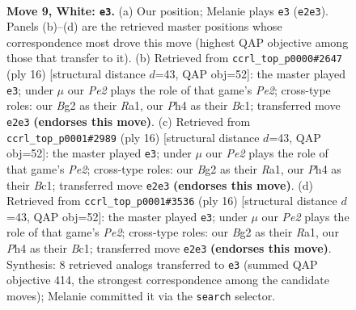 \documentclass[11pt]{article}
\begin{document}
\clearpage

\begin{figure}[p]\centering
\begin{subfigure}{0.46\textwidth}\centering
\resizebox{\linewidth}{!}{%
\newchessgame
\chessboard[
  setfen={1rbq1rk1/pp1pppbp/2n3p1/2p4n/2P4P/5NP1/PP1PPPB1/RNBQ1RK1 w - - 3 9},
  showmover=false,
  pgfstyle=straightmove, color=movearrow, markmove={e2-e3}
]}
\caption{}
\end{subfigure}\hfill
\begin{subfigure}{0.46\textwidth}\centering
\resizebox{\linewidth}{!}{%
\newchessgame
\chessboard[
  setfen={r1bq1rk1/ppp1ppbp/1nn3p1/8/3P4/2N2NP1/PP2PPBP/R1BQ1RK1 w - - 6 9},
  showmover=false,
  pgfstyle=straightmove, color=movearrow, markmove={e2-e3}
]}
\caption{}
\end{subfigure}
\\[4pt]
\begin{subfigure}{0.46\textwidth}\centering
\resizebox{\linewidth}{!}{%
\newchessgame
\chessboard[
  setfen={r1bq1rk1/ppp1ppbp/1nn3p1/8/3P4/2N2NP1/PP2PPBP/R1BQ1RK1 w - - 6 9},
  showmover=false,
  pgfstyle=straightmove, color=movearrow, markmove={e2-e3}
]}
\caption{}
\end{subfigure}\hfill
\begin{subfigure}{0.46\textwidth}\centering
\resizebox{\linewidth}{!}{%
\newchessgame
\chessboard[
  setfen={r1bq1rk1/ppp1ppbp/1nn3p1/8/3P4/2N2NP1/PP2PPBP/R1BQ1RK1 w - - 1 9},
  showmover=false,
  pgfstyle=straightmove, color=movearrow, markmove={e2-e3}
]}
\caption{}
\end{subfigure}
\caption{\textbf{Move 9, White: \texttt{e3}.} (a) Our position; Melanie plays \texttt{e3} (\texttt{e2e3}). Panels (b)--(d) are the retrieved master positions whose correspondence most drove this move (highest QAP objective among those that transfer to it). (b) Retrieved from \texttt{ccrl\_top\_p0000\#2647} (ply 16) [structural distance $d$=43, QAP obj=52]: the master played \texttt{e3}; under $\mu$ our \emph{Pe2} plays the role of that game's \emph{Pe2}; cross-type roles: our \emph{B}g2 as their \emph{R}a1, our \emph{P}h4 as their \emph{B}c1; transferred move \texttt{e2e3} \textbf{(endorses this move)}. (c) Retrieved from \texttt{ccrl\_top\_p0001\#2989} (ply 16) [structural distance $d$=43, QAP obj=52]: the master played \texttt{e3}; under $\mu$ our \emph{Pe2} plays the role of that game's \emph{Pe2}; cross-type roles: our \emph{B}g2 as their \emph{R}a1, our \emph{P}h4 as their \emph{B}c1; transferred move \texttt{e2e3} \textbf{(endorses this move)}. (d) Retrieved from \texttt{ccrl\_top\_p0001\#3536} (ply 16) [structural distance $d$=43, QAP obj=52]: the master played \texttt{e3}; under $\mu$ our \emph{Pe2} plays the role of that game's \emph{Pe2}; cross-type roles: our \emph{B}g2 as their \emph{R}a1, our \emph{P}h4 as their \emph{B}c1; transferred move \texttt{e2e3} \textbf{(endorses this move)}. Synthesis: 8 retrieved analogs transferred to \texttt{e3} (summed QAP objective 414, the strongest correspondence among the candidate moves); Melanie committed it via the \texttt{search} selector.}
\label{fig:thought-m16}
\end{figure}
\end{document}
